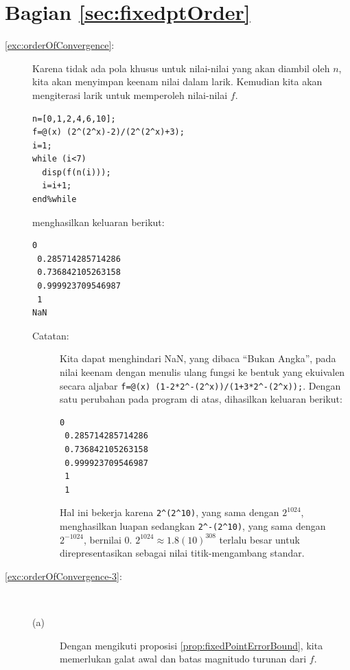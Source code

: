 \section*{Bagian \ref{sec:fixedptOrder}}
\begin{description}
\item [{\ref{exc:orderOfConvergence}:}] Karena tidak ada pola khusus untuk
nilai-nilai yang akan diambil oleh $n$, kita akan menyimpan keenam
nilai dalam larik. Kemudian kita akan mengiterasi larik untuk memperoleh
nilai-nilai $f$. 

\begin{verbatim}
n=[0,1,2,4,6,10];
f=@(x) (2^(2^x)-2)/(2^(2^x)+3);
i=1;
while (i<7)
  disp(f(n(i)));
  i=i+1;
end%while
\end{verbatim}

menghasilkan keluaran berikut:

\begin{verbatim}
0
 0.285714285714286
 0.736842105263158
 0.999923709546987
 1
NaN
\end{verbatim}
\begin{description}
\item [{Catatan:}] Kita dapat menghindari NaN, yang dibaca ``Bukan Angka'',
pada nilai keenam dengan menulis ulang fungsi ke bentuk yang ekuivalen
secara aljabar \texttt{f=@(x) (1-2{*}2\textasciicircum -(2\textasciicircum x))/(1+3{*}2\textasciicircum -(2\textasciicircum x));}.
Dengan satu perubahan pada program di atas, dihasilkan keluaran berikut:

\begin{verbatim}
0
 0.285714285714286
 0.736842105263158
 0.999923709546987
 1
 1
\end{verbatim}

Hal ini bekerja karena \texttt{2\textasciicircum (2\textasciicircum 10)},
yang sama dengan $2^{1024}$, menghasilkan luapan sedangkan \texttt{2\textasciicircum -(2\textasciicircum 10)},
yang sama dengan $2^{-1024}$, bernilai $0$. $2^{1024}\approx1.8(10)^{308}$
terlalu besar untuk direpresentasikan sebagai nilai titik-mengambang
standar.
\end{description}
\item [{\ref{exc:orderOfConvergence-3}:}]~

\begin{description}
\item [{(a)}] Dengan mengikuti proposisi \ref{prop:fixedPointErrorBound},
kita memerlukan galat awal dan batas magnitudo turunan dari $f$.


\end{description}
\end{description}
